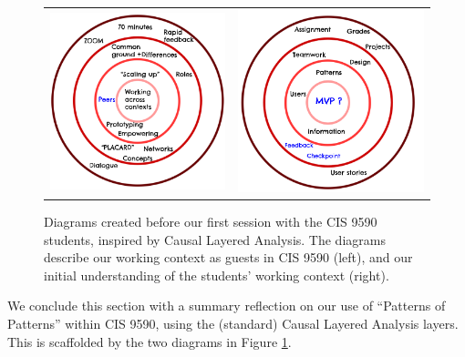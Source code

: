 \documentclass[acmlarge,timestamp]{acmart}
\begin{document}
\begin{figure}[h]
  \begin{tabular}{cc}
    \includegraphics[width=.43\textwidth]{UsCLA.png} &
    \includegraphics[width=.45\textwidth]{ThemCLA.png}
  \end{tabular}
\caption{Diagrams created before our first session with the CIS 9590 students, inspired by Causal Layered Analysis.  The diagrams describe our working context as guests in CIS 9590 (left), and our initial understanding of the students’ working context (right).\label{cis-9590-anticipations}}
\end{figure}

We conclude this section with a summary reflection on our use of
``Patterns of Patterns” within CIS 9590, using the (standard) Causal
Layered Analysis layers.  This is scaffolded by the two diagrams in
Figure \ref{cis-9590-anticipations}.
\end{document}
